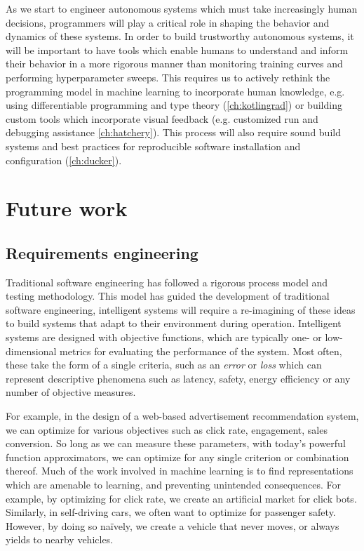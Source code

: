 \documentclass[12pt,initial,twoside,maitrise]{dms}
\numberwithin{equation}{section}
\numberwithin{table}{chapter}
\numberwithin{figure}{chapter}
\begin{document}
As we start to engineer autonomous systems which must take increasingly human decisions, programmers will play a critical role in shaping the behavior and dynamics of these systems. In order to build trustworthy autonomous systems, it will be important to have tools which enable humans to understand and inform their behavior in a more rigorous manner than monitoring training curves and performing hyperparameter sweeps. This requires us to actively rethink the programming model in machine learning to incorporate human knowledge, e.g. using differentiable programming and type theory (\autoref{ch:kotlingrad}) or building custom tools which incorporate visual feedback (e.g. customized run and debugging assistance \autoref{ch:hatchery}). This process will also require sound build systems and best practices for reproducible software installation and configuration (\autoref{ch:ducker}).

\section{Future work}

\subsection{Requirements engineering}

Traditional software engineering has followed a rigorous process model and testing methodology. This model has guided the development of traditional software engineering, intelligent systems will require a re-imagining of these ideas to build systems that adapt to their environment during operation. Intelligent systems are designed with objective functions, which are typically one- or low-dimensional metrics for evaluating the performance of the system. Most often, these take the form of a single criteria, such as an \textit{error} or \textit{loss} which can represent descriptive phenomena such as latency, safety, energy efficiency or any number of objective measures.

For example, in the design of a web-based advertisement recommendation system, we can optimize for various objectives such as click rate, engagement, sales conversion. So long as we can measure these parameters, with today's powerful function approximators, we can optimize for any single criterion or combination thereof. Much of the work involved in machine learning is to find representations which are amenable to learning, and preventing unintended consequences. For example, by optimizing for click rate, we create an artificial market for click bots. Similarly, in self-driving cars, we often want to optimize for passenger safety. However, by doing so na\"ively, we create a vehicle that never moves, or always yields to nearby vehicles.
\end{document}
